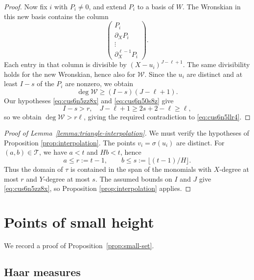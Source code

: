 \documentclass[reqno]{amsart} 
\begin{document}
\begin{proof}
  Now fix $i$ with $P_i\neq0$, and extend $P_i$ to a basis of $W$.  The Wronskian in this new basis contains the column
  \begin{equation*}
    \begin{pmatrix}
      P_i \\ \partial_X P_i \\ \vdots \\ \partial_X^{\ell-1} P_i
    \end{pmatrix}.
  \end{equation*}
  Each entry in that column is divisible by $(X-u_i)^{J-\ell+1}$.  The same divisibility holds for the new Wronskian, hence also for $\mathcal W$.
  Since the $u_i$ are distinct and at least $I-s$ of the $P_i$ are nonzero, we obtain
  \begin{equation*}
    \deg\mathcal W\geq(I-s)(J - \ell + 1).
  \end{equation*}
  Our hypotheses \eqref{eq:cus6n5zz8x} and \eqref{eq:cus6n50s8z} give
  \begin{equation*}
    I - s > r, \quad J-\ell+1\geq 2s+2-\ell\geq\ell,
  \end{equation*}
  so we obtain $\deg\mathcal W > r \ell$, giving the required contradiction to \eqref{eq:cus6n5llr4}.
\end{proof}

\begin{proof}[Proof of Lemma~\ref{lemma:triangle-interpolation}]
  We must verify the hypotheses of Proposition \ref{prop:interpolation}.  The points $v_i = \sigma(u_i)$ are distinct.  For $(a, b) \in \mathcal{T}$, we have $a < t$ and $H b < t$, hence
  \begin{equation}\label{eq:cus6n580mv}
    a \leq r := t - 1, \qquad b \leq s := \lfloor(t - 1)/H\rfloor.
  \end{equation}
  Thus the domain of $\tau$ is contained in the span of the monomials with $X$-degree at most $r$ and $Y$-degree at most $s$.  The assumed bounds on $I$ and $J$ give \eqref{eq:cus6n5zz8x}, so Proposition \ref{prop:interpolation} applies.
\end{proof}

\section{Points of small height}\label{appendix:small}

We record a proof of Proposition~\ref{prop:small-set}.

\subsection{Haar measures}\label{sec:cus71nhjko}
\end{document}
